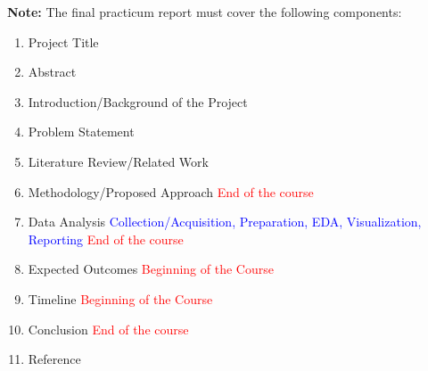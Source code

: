 \documentclass[12pt, onecolumn]{IEEEtran}
\begin{document}
\vspace{0.5cm}


\noindent \textbf{Note:} The final practicum report must cover the following components:
\begin{enumerate}
  \item Project Title 
  \item Abstract
  \item Introduction/Background of the Project
  \item Problem Statement
  \item Literature Review/Related Work
  \item Methodology/Proposed Approach \textcolor{red}{End of the course}
  \item Data Analysis \textcolor{blue}{Collection/Acquisition, Preparation, EDA, Visualization, Reporting} \textcolor{red}{End of the course}
  \item Expected Outcomes \textcolor{red}{Beginning of the Course}
  \item Timeline \textcolor{red}{Beginning of the Course}
  \item Conclusion \textcolor{red}{End of the course}
  \item Reference
\end{enumerate}




\end{document}
